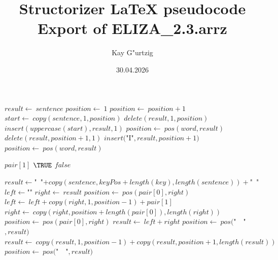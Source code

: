 \documentclass[a4paper,10pt]{article}
\title{Structorizer LaTeX pseudocode Export of ELIZA\_2.3.arrz}
\author{Kay G"urtzig}
\date{30.04.2026}
\begin{document}
\begin{algorithm}
\caption{adjustSpelling(sentence)}
\begin{algorithmic}[5]

\STATE {}
  \STATE \(result\gets\ sentence\)
  \STATE \(position\gets\ 1\)
    \STATE \(position\gets\ position+1\)
  \ENDWHILE
    \STATE \(start\gets\ copy(sentence,1,position)\)
    \STATE \(delete(result,1,position)\)
    \STATE \(insert(uppercase(start),result,1)\)
  \ENDIF
    \STATE \(position\gets\ pos(word,result)\)
      \STATE \(delete(result,position+1,1)\)
      \STATE \(insert(\)"{}I"{}\(,result,position+1)\)
      \STATE \(position\gets\ pos(word,result)\)
    \ENDWHILE
  \ENDFOR

\end{algorithmic}
\end{algorithm}


\begin{algorithm}
\caption{checkGoodBye(text, phrases)}
\begin{algorithmic}[5]

\STATE {}
\STATE {}
\STATE {}
\STATE {}
      \PRINT\(pair[1]\)
      \RETURN\(\TRUE\)
    \ENDIF
  \ENDFOR
  \RETURN\(false\)

\end{algorithmic}
\end{algorithm}


\begin{algorithm}
\caption{conjugateStrings(sentence, key, keyPos, flexions)}
\begin{algorithmic}[5]

  \STATE \(result\gets\)"{}\ "{}\(+copy(sentence,keyPos+length(key),length(sentence))+\)"{}\ "{}\(\)
    \STATE \(left\gets\)"{}"{}\(\)
    \STATE \(right\gets\ result\)
    \STATE \(position\gets\ pos(pair[0],right)\)
      \STATE \(left\gets\ left+copy(right,1,position-1)+pair[1]\)
      \STATE \(right\gets\ copy(right,position+length(pair[0]),length(right))\)
      \STATE \(position\gets\ pos(pair[0],right)\)
    \ENDWHILE
    \STATE \(result\gets\ left+right\)
  \ENDFOR
  \STATE \(position\gets\ pos(\)"{}\ \ "{}\(,result)\)
    \STATE \(result\gets\ copy(result,1,position-1)+copy(result,position+1,length(result))\)
    \STATE \(position\gets\ pos(\)"{}\ \ "{}\(,result)\)
  \ENDWHILE

\end{algorithmic}
\end{algorithm}
\end{document}
